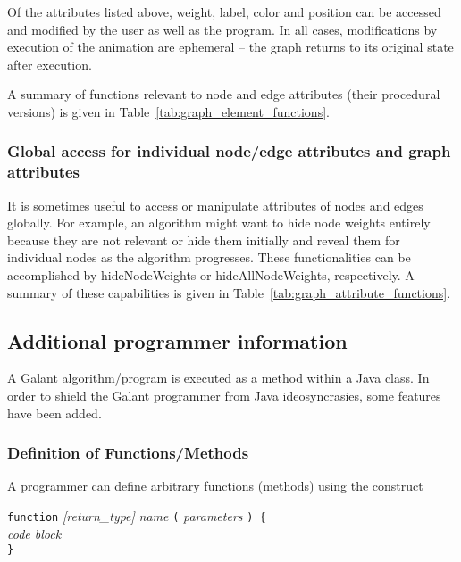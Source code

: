 Of the attributes listed above, weight, label, color and position can be
accessed and modified by the user as well as the program.
In all cases, modifications by execution of the animation are ephemeral
-- the graph returns to its original state after execution.



A summary of functions relevant to node and edge attributes (their procedural versions)
is given in Table~\ref{tab:graph_element_functions}.

\subsubsection{Global access for individual node/edge attributes and graph attributes}



It is sometimes useful to access or manipulate attributes of nodes and edges
globally.
For example, an algorithm might want to hide node weights entirely
because they are not relevant
or hide them initially and reveal them for individual nodes as
the algorithm progresses.
These functionalities can be accomplished by
\textsf{hideNodeWeights} or \textsf{hideAllNodeWeights}, respectively.
A summary of these capabilities is given in Table~\ref{tab:graph_attribute_functions}.

\subsection{Additional programmer information}

A Galant algorithm/program is executed as a method within a Java class.
In order to shield the Galant programmer from Java ideosyncrasies,
some features have been added.

\subsubsection{Definition of Functions/Methods}\label{sec:functions}

A programmer can define arbitrary functions (methods) using the construct

\texttt{function} \textsl{[return\_type]} \textsl{name} \texttt{(}
 \textsl{parameters} \texttt{) \{} \\
 \hspace*{3em} \emph{code block} \\
 \texttt{\}}

